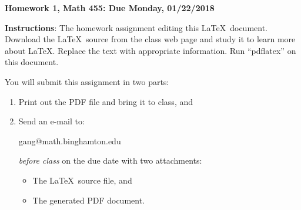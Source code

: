 \documentclass[12pt]{article}
\begin{document}
\begin{title}
	{\Large\bf Homework 1, Math 455: Due Monday, 01/22/2018}
\end{title}

\author{\bf Alexander Van Roijen}

\maketitle
{\bf Instructions}:  The homework assignment editing this \LaTeX\ document.  Download the \LaTeX\ source from the class web page and study
it to learn more about \LaTeX.  Replace the text with appropriate information.  Run ``pdflatex'' on this document.

You will submit this assignment in two parts:
\begin{enumerate}
\item Print out the PDF file and bring it to class, and
\item Send an e-mail to:
\begin{center}
gang@math.binghamton.edu
\end{center}
\emph{before class} on the due date with two attachments:
\begin{itemize}
\item The \LaTeX\ source file, and
\item The generated PDF document.
\end{itemize}
\end{enumerate}
\end{document}
